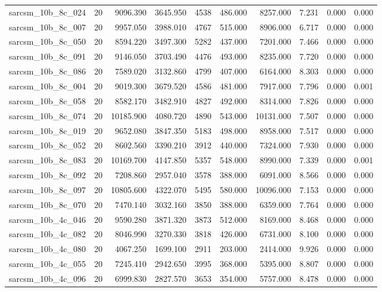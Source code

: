 \begin{tabular}{lrrrrrrrrr}
sarcsm\_10b\_8c\_024 & 20 & 9096.390 & 3645.950 & 4538 & 486.000 & 8257.000 & 7.231 & 0.000 & 0.000 \\
sarcsm\_10b\_8c\_007 & 20 & 9957.050 & 3988.010 & 4767 & 515.000 & 8906.000 & 6.717 & 0.000 & 0.000 \\
sarcsm\_10b\_8c\_050 & 20 & 8594.220 & 3497.300 & 5282 & 437.000 & 7201.000 & 7.466 & 0.000 & 0.000 \\
sarcsm\_10b\_8c\_091 & 20 & 9146.050 & 3703.490 & 4476 & 493.000 & 8235.000 & 7.720 & 0.000 & 0.000 \\
sarcsm\_10b\_8c\_086 & 20 & 7589.020 & 3132.860 & 4799 & 407.000 & 6164.000 & 8.303 & 0.000 & 0.000 \\
sarcsm\_10b\_8c\_004 & 20 & 9019.300 & 3679.520 & 4586 & 481.000 & 7917.000 & 7.796 & 0.000 & 0.001 \\
sarcsm\_10b\_8c\_058 & 20 & 8582.170 & 3482.910 & 4827 & 492.000 & 8314.000 & 7.826 & 0.000 & 0.000 \\
sarcsm\_10b\_8c\_074 & 20 & 10185.900 & 4080.720 & 4890 & 543.000 & 10131.000 & 7.507 & 0.000 & 0.000 \\
sarcsm\_10b\_8c\_019 & 20 & 9652.080 & 3847.350 & 5183 & 498.000 & 8958.000 & 7.517 & 0.000 & 0.000 \\
sarcsm\_10b\_8c\_052 & 20 & 8602.560 & 3390.210 & 3912 & 440.000 & 7324.000 & 7.930 & 0.000 & 0.000 \\
sarcsm\_10b\_8c\_083 & 20 & 10169.700 & 4147.850 & 5357 & 548.000 & 8990.000 & 7.339 & 0.000 & 0.001 \\
sarcsm\_10b\_8c\_092 & 20 & 7208.860 & 2957.040 & 3578 & 388.000 & 6091.000 & 8.566 & 0.000 & 0.000 \\
sarcsm\_10b\_8c\_097 & 20 & 10805.600 & 4322.070 & 5495 & 580.000 & 10096.000 & 7.153 & 0.000 & 0.000 \\
sarcsm\_10b\_8c\_070 & 20 & 7470.140 & 3032.160 & 3850 & 388.000 & 6359.000 & 7.764 & 0.000 & 0.000 \\
sarcsm\_10b\_4c\_046 & 20 & 9590.280 & 3871.320 & 3873 & 512.000 & 8169.000 & 8.468 & 0.000 & 0.000 \\
sarcsm\_10b\_4c\_082 & 20 & 8046.990 & 3270.330 & 3818 & 426.000 & 6731.000 & 8.100 & 0.000 & 0.000 \\
sarcsm\_10b\_4c\_080 & 20 & 4067.250 & 1699.100 & 2911 & 203.000 & 2414.000 & 9.926 & 0.000 & 0.000 \\
sarcsm\_10b\_4c\_055 & 20 & 7245.410 & 2942.650 & 3995 & 368.000 & 5395.000 & 8.807 & 0.000 & 0.000 \\
sarcsm\_10b\_4c\_096 & 20 & 6999.830 & 2827.570 & 3653 & 354.000 & 5757.000 & 8.478 & 0.000 & 0.000 \\

\end{tabular}
